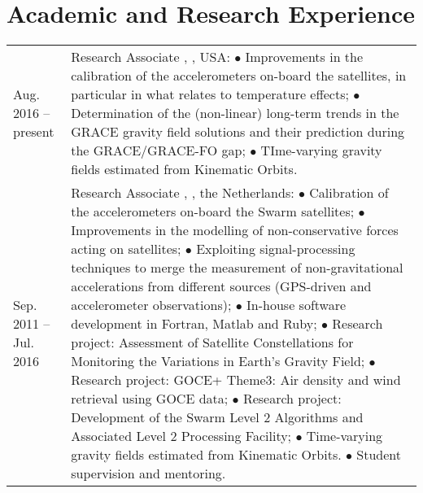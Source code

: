 \documentclass[a4paper]{article}
\newcommand{\dynhref}[2]{%
  \iftoggle{expliciturl}{%
    #2 (\href{#1}{\texttt{\detokenize{#1}}})%
  }{%
    \href{#1}{#2}%
  }%
}
\newlength{\listskipbig}
\newenvironment{cvsection}[2]{
  \setlength{\floatsep}{0pt}
  \setlength{\textfloatsep}{0pt}
  \setlength{\intextsep}{0pt}
  \section*{#1}
  \begin{longtable}{lp{#2}}
}{
  \end{longtable}
}
\begin{document}

\begin{cvsection}{Academic and Research Experience}{10.8cm}

Aug. 2016 -- present
  & Research Associate\newline
    \dynhref{http://www.csr.utexas.edu}{Center for Space Research}, \dynhref{http://www.utexas.edu}{Texas University at Austin}, USA:\newline
    $\bullet$ Improvements in the calibration of the accelerometers on-board the \dynhref{http://www.csr.utexas.edu/grace/}{GRACE} satellites, in particular in what relates to temperature effects;\newline
    $\bullet$ Determination of the (non-linear) long-term trends in the GRACE gravity field solutions and their prediction during the GRACE/GRACE-FO gap;
    $\bullet$ TIme-varying gravity fields estimated from Kinematic Orbits.
    \\[\listskipbig]

Sep. 2011 -- Jul. 2016
  & Research Associate\newline
    \dynhref{http://www.as.lr.tudelft.nl}{Astrodynamics and Space Missions}, \dynhref{http://www.tudelft.nl/}{Delft University of Technology}, the Netherlands:\newline
    $\bullet$ Calibration of the accelerometers on-board the Swarm satellites;\newline
    $\bullet$ Improvements in the modelling of non-conservative forces acting on satellites;\newline
    $\bullet$ Exploiting signal-processing techniques to merge the measurement of non-gravitational accelerations from different sources (GPS-driven and accelerometer observations);\newline
    $\bullet$ In-house software development in Fortran, Matlab and Ruby;\newline
    $\bullet$ Research project: Assessment of Satellite Constellations for Monitoring the Variations in Earth's Gravity Field;\newline
    $\bullet$ Research project: GOCE+ Theme3: Air density and wind retrieval using GOCE data;\newline
    $\bullet$ Research project: Development of the Swarm Level 2 Algorithms and Associated Level 2 Processing Facility;\newline
    $\bullet$ Time-varying gravity fields estimated from Kinematic Orbits.
    $\bullet$ Student supervision and mentoring.
    \\[\listskipbig]


\end{cvsection}
\end{document}

